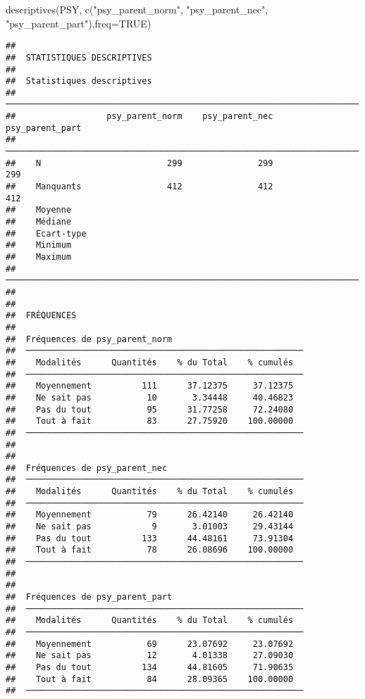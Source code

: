 \documentclass[
]{article}
\newenvironment{Shaded}{\begin{snugshade}}{\end{snugshade}}
\newcommand{\AttributeTok}[1]{\textcolor[rgb]{0.77,0.63,0.00}{#1}}
\newcommand{\ConstantTok}[1]{\textcolor[rgb]{0.00,0.00,0.00}{#1}}
\newcommand{\FunctionTok}[1]{\textcolor[rgb]{0.00,0.00,0.00}{#1}}
\newcommand{\NormalTok}[1]{#1}
\newcommand{\StringTok}[1]{\textcolor[rgb]{0.31,0.60,0.02}{#1}}
\begin{document}
\begin{Shaded}
\begin{Highlighting}[]
\FunctionTok{descriptives}\NormalTok{(PSY, }\FunctionTok{c}\NormalTok{(}\StringTok{"psy\_parent\_norm"}\NormalTok{, }\StringTok{"psy\_parent\_nec"}\NormalTok{, }\StringTok{"psy\_parent\_part"}\NormalTok{),}\AttributeTok{freq=}\ConstantTok{TRUE}\NormalTok{)}
\end{Highlighting}
\end{Shaded}

\begin{verbatim}
## 
##  STATISTIQUES DESCRIPTIVES
## 
##  Statistiques descriptives                                              
##  ────────────────────────────────────────────────────────────────────── 
##                  psy_parent_norm    psy_parent_nec    psy_parent_part   
##  ────────────────────────────────────────────────────────────────────── 
##    N                         299               299                299   
##    Manquants                 412               412                412   
##    Moyenne                                                              
##    Médiane                                                              
##    Ecart-type                                                           
##    Minimum                                                              
##    Maximum                                                              
##  ────────────────────────────────────────────────────────────────────── 
## 
## 
##  FRÉQUENCES
## 
##  Fréquences de psy_parent_norm                           
##  ─────────────────────────────────────────────────────── 
##    Modalités      Quantités    % du Total    % cumulés   
##  ─────────────────────────────────────────────────────── 
##    Moyennement          111      37.12375     37.12375   
##    Ne sait pas           10       3.34448     40.46823   
##    Pas du tout           95      31.77258     72.24080   
##    Tout à fait           83      27.75920    100.00000   
##  ─────────────────────────────────────────────────────── 
## 
## 
##  Fréquences de psy_parent_nec                            
##  ─────────────────────────────────────────────────────── 
##    Modalités      Quantités    % du Total    % cumulés   
##  ─────────────────────────────────────────────────────── 
##    Moyennement           79      26.42140     26.42140   
##    Ne sait pas            9       3.01003     29.43144   
##    Pas du tout          133      44.48161     73.91304   
##    Tout à fait           78      26.08696    100.00000   
##  ─────────────────────────────────────────────────────── 
## 
## 
##  Fréquences de psy_parent_part                           
##  ─────────────────────────────────────────────────────── 
##    Modalités      Quantités    % du Total    % cumulés   
##  ─────────────────────────────────────────────────────── 
##    Moyennement           69      23.07692     23.07692   
##    Ne sait pas           12       4.01338     27.09030   
##    Pas du tout          134      44.81605     71.90635   
##    Tout à fait           84      28.09365    100.00000   
##  ───────────────────────────────────────────────────────
\end{verbatim}
\end{document}
